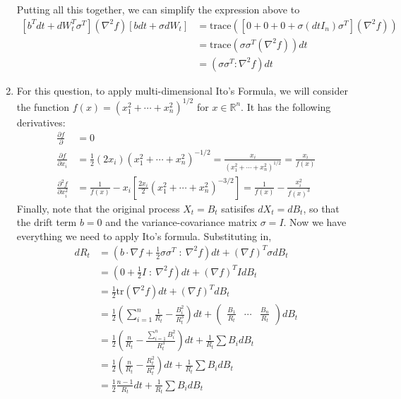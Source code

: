 \documentclass[12pt]{article}
\theoremstyle{plain}
\theoremstyle{definition}
\theoremstyle{remark}
\begin{document}
\begin{enumerate}
    Putting all this together, we can simplify the expression above to
    \begin{align*}
      \left[b^T dt+ dW_t^T \sigma^T \right](\nabla^2 f)
      \left[b dt+ \sigma dW_t  \right]
      &=
      \text{trace}\left(
        \left[0 + 0 + 0
          + \sigma (dt I_n) \sigma^T
        \right]
        (\nabla^2 f) \right)\\
      &=
      \text{trace}\left(
        \sigma \sigma^T
        (\nabla^2 f) \right) dt\\
      &=
        \left( \sigma \sigma^T : \nabla^2 f \right) dt
    \end{align*}

  \item %
    For this question, to apply multi-dimensional Ito's Formula, we will
    consider the function $f(x) = (x_1^2 + \cdots + x_n^2)^{1/2}$ for
    $x\in\mathbb{R}^n$. It has the following derivatives:
    \begin{align*}
      \frac{\partial f}{\partial } &= 0\\
      \frac{\partial f}{\partial x_i}
        &= \frac{1}{2} (2x_i) (x_1^2+\cdots+x_n^2)^{-1/2}
        = \frac{x_i}{(x_1^2+\cdots+x_n^2)^{1/2}}
        = \frac{x_i}{f(x)}\\
        \frac{\partial^2 f}{\partial x_i^2}
        &= \frac{1}{f(x)} - x_i
        \left[\frac{2x_i}{2}(x_1^2+\cdots+x_n^2)^{-3/2}\right]
        = \frac{1}{f(x)} - \frac{x^2_i}{f(x)^3}
    \end{align*}
    Finally, note that the original process $X_t=B_t$ satisifes $dX_t =
    dB_t$, so that the drift term $b=0$ and the variance-covariance
    matrix $\sigma=I$. Now we have everything we need to apply Ito's
    formula. Substituting in,
    \begin{align*}
      dR_t
      &=
      \left(b \cdot \nabla f + \frac{1}{2}\sigma \sigma^T
      \; : \:
      \nabla^2 f\right)dt + (\nabla f)^T\sigma dB_t\\
      &=
      \left(0 + \frac{1}{2} I
      \; : \:
      \nabla^2 f\right)dt + (\nabla f)^T I dB_t\\
      &= \frac{1}{2}\text{tr}(\nabla^2 f) dt + (\nabla f)^T dB_t\\
      &= \frac{1}{2}
        \left(\sum^n_{i=1} \frac{1}{R_t} - \frac{B_i^2}{R_t^3}\right)dt
        + \begin{pmatrix}
            \frac{B_1}{R_t} & \cdots  &\frac{B_n}{R_t}
          \end{pmatrix}dB_t\\
      &= \frac{1}{2}
        \left(\frac{n}{R_t} - \frac{\sum^n_{i=1} B_i^2}{R_t^3}\right)dt
        + \frac{1}{R_t} \sum B_i dB_t\\
      &= \frac{1}{2}
        \left(\frac{n}{R_t} - \frac{R_t^2}{R_t^3}\right)dt
        + \frac{1}{R_t} \sum B_i dB_t\\
      &= \frac{1}{2}
        \frac{n-1}{R_t} dt
        + \frac{1}{R_t} \sum B_i dB_t\\
    \end{align*}
\end{enumerate}
\end{document}
